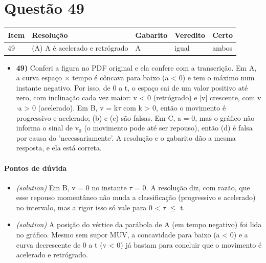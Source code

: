 \documentclass{article}%
\begin{document}
\section*{Questão 49}%
\begin{longtable}{@{}p{} p{} p{} p{} p{}@{}}\toprule Item & Resolução & Gabarito & Veredito & Certo \\ \midrule
49 & (A) A é acelerado e retrógrado & A & igual & ambos \\
\bottomrule\end{longtable}%
\begin{itemize}%
\item%
\textbf{49)} Conferi a figura no PDF original e ela confere com a transcrição. Em A, a curva espaço $\times$ tempo é côncava para baixo (a < 0) e tem o máximo num instante negativo. Por isso, de 0 a t, o espaço cai de um valor positivo até zero, com inclinação cada vez maior: v < 0 (retrógrado) e |v| crescente, com v$\cdot$a > 0 (acelerado). Em B, v = k$\tau$ com k > 0, então o movimento é progressivo e acelerado; (b) e (c) são falsas. Em C, a = 0, mas o gráfico não informa o sinal de v$_{0}$ (o movimento pode até ser repouso), então (d) é falsa por causa do 'necessariamente'. A resolução e o gabarito dão a mesma resposta, e ela está correta.%
\end{itemize}%
\paragraph{Pontos de dúvida}%
\begin{itemize}%
\item%
\textit{(solution)} Em B, v = 0 no instante $\tau$ = 0. A resolução diz, com razão, que esse repouso momentâneo não muda a classificação (progressivo e acelerado) no intervalo, mas a rigor isso só vale para 0 < $\tau$ $\leq$ t.%
\item%
\textit{(solution)} A posição do vértice da parábola de A (em tempo negativo) foi lida no gráfico. Mesmo sem supor MUV, a concavidade para baixo (a < 0) e a curva decrescente de 0 a t (v < 0) já bastam para concluir que o movimento é acelerado e retrógrado.%
\end{itemize}%
\end{document}
